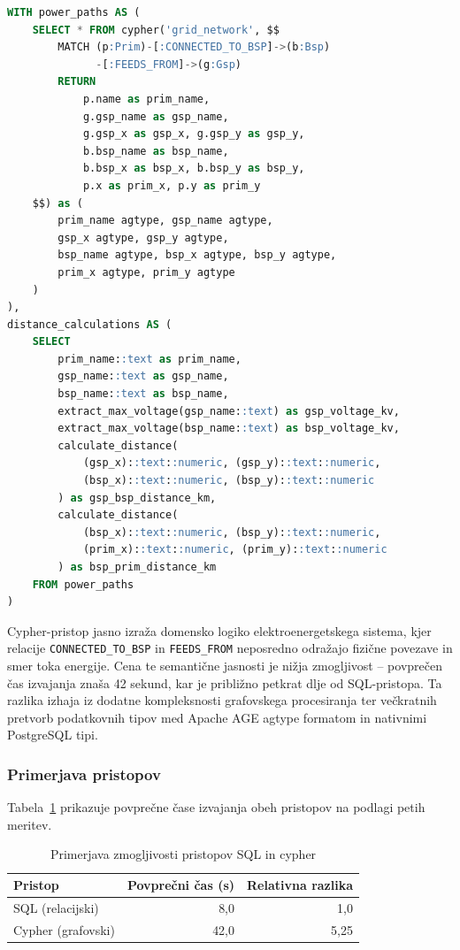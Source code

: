 \documentclass[a4paper,12pt,openright]{book}
\begin{document}
\begin{lstlisting}[language=SQL, caption={Cypher pristop - grafovska navigacija}, captionpos=b, label={lst:power_loss_cypher}]
WITH power_paths AS (
    SELECT * FROM cypher('grid_network', $$
        MATCH (p:Prim)-[:CONNECTED_TO_BSP]->(b:Bsp)
              -[:FEEDS_FROM]->(g:Gsp)
        RETURN
            p.name as prim_name,
            g.gsp_name as gsp_name,
            g.gsp_x as gsp_x, g.gsp_y as gsp_y,
            b.bsp_name as bsp_name,
            b.bsp_x as bsp_x, b.bsp_y as bsp_y,
            p.x as prim_x, p.y as prim_y
    $$) as (
        prim_name agtype, gsp_name agtype,
        gsp_x agtype, gsp_y agtype,
        bsp_name agtype, bsp_x agtype, bsp_y agtype,
        prim_x agtype, prim_y agtype
    )
),
distance_calculations AS (
    SELECT
        prim_name::text as prim_name,
        gsp_name::text as gsp_name,
        bsp_name::text as bsp_name,
        extract_max_voltage(gsp_name::text) as gsp_voltage_kv,
        extract_max_voltage(bsp_name::text) as bsp_voltage_kv,
        calculate_distance(
            (gsp_x)::text::numeric, (gsp_y)::text::numeric,
            (bsp_x)::text::numeric, (bsp_y)::text::numeric
        ) as gsp_bsp_distance_km,
        calculate_distance(
            (bsp_x)::text::numeric, (bsp_y)::text::numeric,
            (prim_x)::text::numeric, (prim_y)::text::numeric
        ) as bsp_prim_distance_km
    FROM power_paths
)
\end{lstlisting}

Cypher-pristop jasno izraža domensko logiko elektroenergetskega sistema, kjer relacije \texttt{CONNECTED\_TO\_BSP} in \texttt{FEEDS\_FROM} neposredno odražajo fizične povezave in smer toka energije. Cena te semantične jasnosti je nižja zmogljivost – povprečen čas izvajanja znaša 42 sekund, kar je približno petkrat dlje od SQL-pristopa. Ta razlika izhaja iz dodatne kompleksnosti grafovskega procesiranja ter večkratnih pretvorb podatkovnih tipov med Apache AGE agtype formatom in nativnimi PostgreSQL tipi.

\subsubsection{Primerjava pristopov}

Tabela~\ref{tab:query_performance} prikazuje povprečne čase izvajanja obeh pristopov na podlagi petih meritev.
\breakpage
\begin{table}[h]
\centering
\caption{Primerjava zmogljivosti pristopov SQL in cypher}
\label{tab:query_performance}
\begin{tabular}{lrr}
\hline
\textbf{Pristop} & \textbf{Povprečni čas (s)} & \textbf{Relativna razlika} \\
\hline
SQL (relacijski) & 8,0& 1,0\\
Cypher (grafovski) & 42,0& 5,25\\
\hline
\end{tabular}
\end{table}
\end{document}
